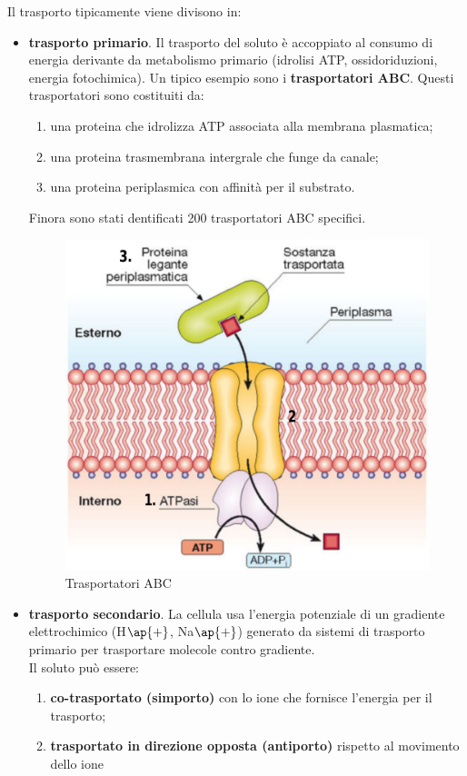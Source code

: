 \documentclass[11pt]{book}
\begin{document}
Il trasporto tipicamente viene divisono in:
\begin{itemize}
\item \textbf{trasporto primario}. Il trasporto del soluto è accoppiato al consumo di energia derivante da metabolismo primario (idrolisi ATP, ossidoriduzioni, energia fotochimica).
Un tipico esempio sono i \textbf{trasportatori ABC}. Questi trasportatori sono costituiti da:
\begin{enumerate}
\item una proteina che idrolizza ATP associata alla membrana plasmatica; 
\item una proteina trasmembrana intergrale che funge da canale;
\item una proteina periplasmica con affinità per il substrato.
\end{enumerate}
Finora sono stati dentificati 200 trasportatori ABC specifici. 

\clearpage
\begin{figure}[htp]
\centering
\includegraphics[scale=0.4]{img/Trasportatore ABC.png}
\caption{Trasportatori ABC}
\label{}
\end{figure}

\item \textbf{trasporto secondario}. La cellula usa l'energia potenziale di un gradiente elettrochimico (H$\ap{+}$, Na$\ap{+}$) generato da sistemi di
trasporto primario per trasportare molecole contro gradiente.\\
Il soluto può essere:
\begin{enumerate}
\item \textbf{co-trasportato (simporto)} con lo ione che fornisce l’energia per il trasporto;
\item \textbf{trasportato in direzione opposta (antiporto)} rispetto al movimento dello ione
\end{enumerate}


\end{itemize}
\end{document}
